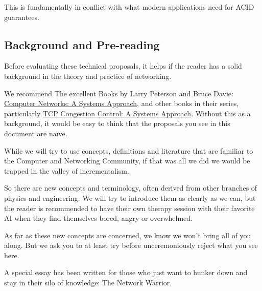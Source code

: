 \documentclass[../../../OAE-SPEC-MAIN.tex]{subfiles}
\begin{document}
This is fundamentally in conflict with what modern applications need for ACID guarantees.

\subsection{Background and Pre-reading}

Before evaluating these technical proposals, it helps if the reader has a solid background in the theory and practice of networking.

We recommend The excellent Books by Larry Peterson and Bruce Davie: \href{https://book.systemsapproach.org}{Computer Networks: A Systems Approach}, and other books in their series, particularly \href{https://tcpcc.systemsapproach.org}{TCP Congestion Control: A Systems Approach}.   Without this as a background, it would be easy to think that the proposals you see in this document are naïve.

While we will try to use concepts, definitions and literature that are familiar to the Computer and Networking Community, if that was all we did we would be trapped in the valley of incrementalism.

So there are new concepts and terminology, often derived from other branches of physics and engineering. We will try to introduce them as clearly as we can, but the reader is recommended to have their own therapy session with their favorite AI when they find themselves bored, angry or overwhelmed.

As far as these new concepts are concerned, we know we won't bring all of you along.  But we ask you to at least try before unceremoniously reject what you see here. 

A special essay has been written for those who just want to hunker down and stay in their silo of knowledge: The Network Warrior.  
\end{document}
